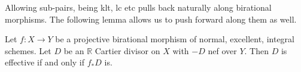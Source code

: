 Allowing sub-pairs, being klt, lc etc pulls back naturally along birational morphisms. The following lemma allows us to push forward along them as well.

\begin{lemma}\cite[Lemma 2.14]{bhatt2020}\label{negatvity}
	Let $f\colon X \to Y$ be a projective birational morphism of normal, excellent, integral schemes. Let $D$ be an $\mathbb{R}$ Cartier divisor on $X$ with $-D$ nef over $Y$. Then $D$ is effective if and only if $f_{*}D$ is.
\end{lemma}

%

